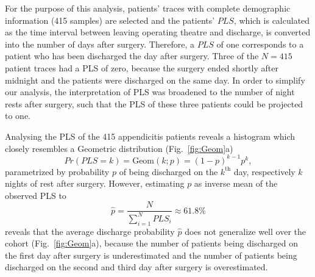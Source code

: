For the purpose of this analysis, patients' traces with complete
demographic information (415 samples) are selected and
the patients' $PLS$, which is
calculated as the time interval between leaving operating theatre and discharge, is
converted into the number of days after surgery. Therefore, a $PLS$ of
one corresponds to a patient who has been discharged the day after
surgery. Three of the $N=415$  %
patient traces had a PLS of zero, because the surgery ended shortly after midnight and the patients were discharged on the same day. In order to simplify our analysis, the interpretation of PLS was broadened to the number of night rests after surgery, such that the PLS of these three patients could be projected to one.

Analysing the PLS of the 415 appendicitis patients reveals a
histogram which closely resembles a Geometric distribution (Fig.~\ref{fig:Geom}a)
\begin{equation}
Pr(PLS=k) = \text{Geom}(k; p) = (1-p)^{k-1}p^{k},
\end{equation}
parametrized by probability $p$ of being discharged on the $k^\text{th}$ day, respectively $k$ nights of rest after surgery. 
However, estimating $p$ as inverse mean of the observed PLS to 
\begin{equation}
 \hat{p} = \frac{N}{\sum\limits_{i=1}^N PLS_i} \approx 61.8\%	
\end{equation}
reveals that the average discharge probability $\hat{p}$ does not
generalize well over the cohort (Fig.~\ref{fig:Geom}a), because the number of patients being discharged on the first day after surgery is underestimated and the number of patients being discharged on the second and third day after surgery is overestimated.

